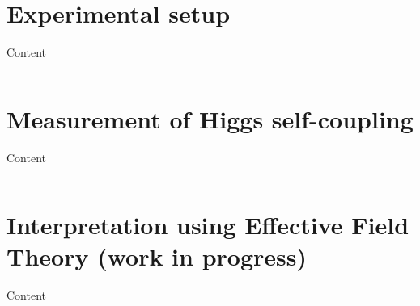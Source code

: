 \documentclass[10pt,aspectratio=169]{beamer}
\begin{document}
\section{Experimental setup}

\begin{frame}{Content}
\label{content}
    \begin{columns}[t]
        \begin{column}{.5\textwidth}
            \tableofcontents[sections={1-5},currentsection]
        \end{column}
        \begin{column}{.5\textwidth}
            \tableofcontents[sections={6-},currentsection]
        \end{column}
    \end{columns}
\end{frame}



\section{Measurement of Higgs self-coupling}

\begin{frame}{Content}
\label{content}
    \begin{columns}[t]
        \begin{column}{.5\textwidth}
            \tableofcontents[sections={1-5},currentsection]
        \end{column}
        \begin{column}{.5\textwidth}
            \tableofcontents[sections={6-},currentsection]
        \end{column}
    \end{columns}
\end{frame}



\section{Interpretation using Effective Field Theory \textcolor{HHred}{(work in progress)}}

\begin{frame}{Content}
\label{content}
    \begin{columns}[t]
        \begin{column}{.5\textwidth}
            \tableofcontents[sections={1-5},currentsection]
        \end{column}
        \begin{column}{.5\textwidth}
            \tableofcontents[sections={6-},currentsection]
        \end{column}
    \end{columns}
\end{frame}
\end{document}
